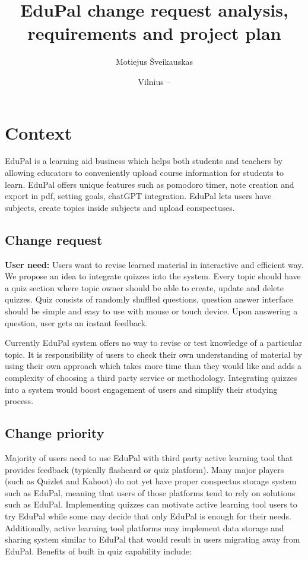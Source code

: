 \documentclass[
    english, %
]{VUMIFPSkursinis}
\title{EduPal change request analysis, requirements and project plan}
\author{Motiejus Šveikauskas}
\date{Vilnius – \the\year}
\begin{document}
\maketitle

\tableofcontents

\section{Context}

EduPal is a learning aid business which helps both students and teachers by allowing educators to conveniently upload course information for students to learn. EduPal offers unique features such as pomodoro timer, note creation and export in pdf, setting goals, chatGPT integration. EduPal lets users have subjects, create topics inside subjects and upload conspectuses.

\subsection{Change request}

\textbf{User need:} Users want to revise learned material in interactive and efficient way. We propose an idea to integrate quizzes into the system. Every topic should have a quiz section where topic owner  should be able to create, update and delete quizzes. Quiz consists of randomly shuffled questions, question answer interface should be simple and easy to use with mouse or touch device. Upon answering a question, user gets an instant feedback.

\vspace{\baselineskip}

Currently EduPal system offers no way to revise or test knowledge of a particular topic. It is responsibility of users to check their own understanding of material by using their own approach which takes more time than they would like and adds a complexity of choosing a third party service or methodology. Integrating quizzes into a system would boost engagement of users and simplify their studying process.

\subsection{Change priority}

Majority of users need to use EduPal with third party active learning tool that provides feedback (typically flashcard or quiz platform). Many major players (such as Quizlet and Kahoot) do not yet have proper conspectus storage system such as EduPal, meaning that users of those platforms tend to rely on solutions such as EduPal. Implementing quizzes can motivate active learning tool users to try EduPal while some may decide that only EduPal is enough for their needs. Additionally, active learning tool platforms may implement data storage and sharing system similar to EduPal that would result in users migrating away from EduPal. Benefits of built in quiz capability include:
\end{document}
